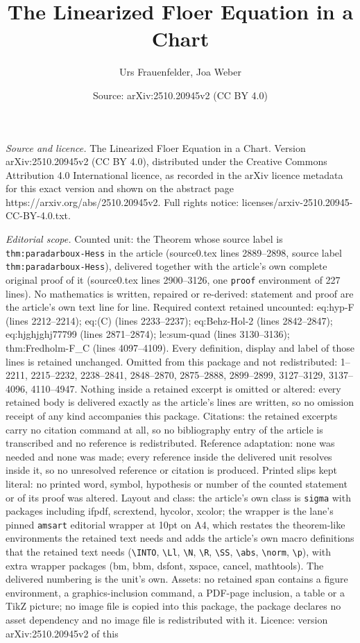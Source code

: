 \documentclass[10pt,a4paper]{amsart}
\title[The Linearized Floer Equation in a Chart]{The Linearized Floer Equation in a Chart}
\author{Urs Frauenfelder, Joa Weber}
\date{Source: arXiv:2510.20945v2 (CC BY 4.0)}
\begin{document}
\maketitle

\noindent\emph{Source and licence.} The Linearized Floer Equation in a Chart. Version arXiv:2510.20945v2 (CC BY 4.0), distributed under the Creative Commons Attribution 4.0 International licence, as recorded in the arXiv licence metadata for this exact version and shown on the abstract page https://arxiv.org/abs/2510.20945v2. Full rights notice: licenses/arxiv-2510.20945-CC-BY-4.0.txt.\par\smallskip

\noindent\textit{Editorial scope.} Counted unit: the Theorem whose source label is \texttt{thm:paradarboux-Hess} in the article (source0.tex lines 2889--2898, source label \texttt{thm:paradarboux-Hess}), delivered together with the article's own complete original proof of it (source0.tex lines 2900--3126, one \texttt{proof} environment of 227 lines). No mathematics is written, repaired or re-derived: statement and proof are the article's own text line for line. Required context retained uncounted: eq:hyp-F (lines 2212--2214); eq:(C) (lines 2233--2237); eq:Behz-Hol-2 (lines 2842--2847); eq:hjghjghj77799 (lines 2871--2874); le:sum-quad (lines 3130--3136); thm:Fredholm-F\_C (lines 4097--4109). Every definition, display and label of those lines is retained unchanged. Omitted from this package and not redistributed: 1--2211, 2215--2232, 2238--2841, 2848--2870, 2875--2888, 2899--2899, 3127--3129, 3137--4096, 4110--4947. Nothing inside a retained excerpt is omitted or altered: every retained body is delivered exactly as the article's lines are written, so no omission receipt of any kind accompanies this package. Citations: the retained excerpts carry no citation command at all, so no bibliography entry of the article is transcribed and no reference is redistributed. Reference adaptation: none was needed and none was made; every reference inside the delivered unit resolves inside it, so no unresolved reference or citation is produced. Printed slips kept literal: no printed word, symbol, hypothesis or number of the counted statement or of its proof was altered. Layout and class: the article's own class is \texttt{sigma} with packages including ifpdf, scrextend, hycolor, xcolor; the wrapper is the lane's pinned \texttt{amsart} editorial wrapper at 10pt on A4, which restates the theorem-like environments the retained text needs and adds the article's own macro definitions that the retained text needs (\texttt{\textbackslash INTO}, \texttt{\textbackslash Ll}, \texttt{\textbackslash N}, \texttt{\textbackslash R}, \texttt{\textbackslash SS}, \texttt{\textbackslash abs}, \texttt{\textbackslash norm}, \texttt{\textbackslash p}), with extra wrapper packages (bm, bbm, dsfont, xspace, cancel, mathtools). The delivered numbering is the unit's own. Assets: no retained span contains a figure environment, a graphics-inclusion command, a PDF-page inclusion, a table or a TikZ picture; no image file is copied into this package, the package declares no asset dependency and no image file is redistributed with it. Licence: version arXiv:2510.20945v2 of this 
\end{document}
